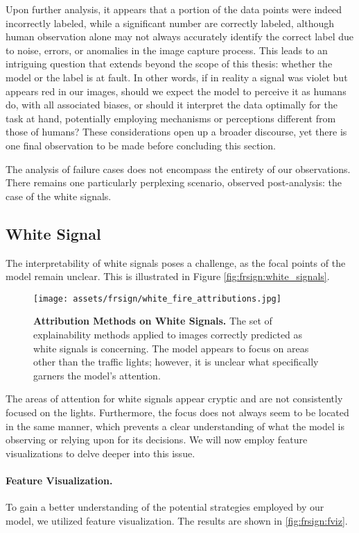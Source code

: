 Upon further analysis, it appears that a portion of the data points were indeed incorrectly labeled, while a significant number are correctly labeled, although human observation alone may not always accurately identify the correct label due to noise, errors, or anomalies in the image capture process. This leads to an intriguing question that extends beyond the scope of this thesis: whether the model or the label is at fault. In other words, if in reality a signal was violet but appears red in our images, should we expect the model to perceive it as humans do, with all associated biases, or should it interpret the data optimally for the task at hand, potentially employing mechanisms or perceptions different from those of humans? These considerations open up a broader discourse, yet there is one final observation to be made before concluding this section.

The analysis of failure cases does not encompass the entirety of our observations. There remains one particularly perplexing scenario, observed post-analysis: the case of the white signals.

\subsection{White Signal}

The interpretability of white signals poses a challenge, as the focal points of the model remain unclear. This is illustrated in Figure \autoref{fig:frsign:white_signals}.

\begin{figure}[ht!]
\centering
\texttt{[image: assets/frsign/white\_fire\_attributions.jpg]}
\caption{\textbf{Attribution Methods on White Signals.} The set of explainability methods applied to images correctly predicted as white signals is concerning. The model appears to focus on areas other than the traffic lights; however, it is unclear what specifically garners the model's attention.}
\label{fig:frsign:white_signals}
\end{figure}

The areas of attention for white signals appear cryptic and are not consistently focused on the lights. Furthermore, the focus does not always seem to be located in the same manner, which prevents a clear understanding of what the model is observing or relying upon for its decisions. We will now employ feature visualizations to delve deeper into this issue.

\paragraph{Feature Visualization.} To gain a better understanding of the potential strategies employed by our model, we utilized feature visualization. The results are shown in \autoref{fig:frsign:fviz}.

